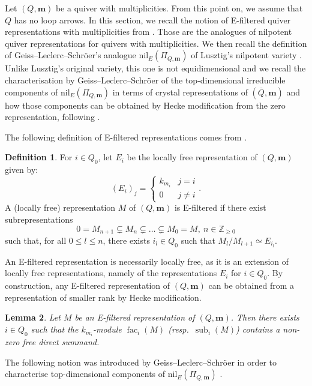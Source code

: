 \documentclass[a4paper,12pt]{article}
\theoremstyle{definition}
\newtheorem{definition}{Definition}[section]
\theoremstyle{plain}
\newtheorem{lemma}[definition]{Lemma}
\theoremstyle{remark}
\DeclareMathOperator{\fac}{fac}
\DeclareMathOperator{\sub}{sub}
\newcommand\bbZ{\mathbb{Z}}
\newcommand\bfm{\mathbf{m}}
\begin{document}
Let $(Q,\bfm)$ be a quiver with multiplicities. From this point on, we assume that $Q$ has no loop arrows. In this section, we recall the notion of E-filtered quiver representations with multiplicities from \cite{GLS18a}. Those are the analogues of nilpotent quiver representations for quivers with multiplicities. We then recall the definition of Geiss--Leclerc--Schr\"{o}er's analogue $\mathrm{nil}_E(\Pi_{Q,\bfm})$ of Lusztig's nilpotent variety \cite[\S 12]{Lus91}. Unlike Lusztig's original variety, this one is not equidimensional and we recall the characterisation by Geiss--Leclerc--Schr\"{o}er of the top-dimensional irreducible components of $\mathrm{nil}_E(\Pi_{Q,\bfm})$ in terms of crystal representations of $(\overline{Q},\bfm)$ and how those components can be obtained by Hecke modification from the zero representation, following \cite[\S 4]{GLS18a}.

The following definition of E-filtered representations comes from \cite[\S 2.1]{GLS18a}.

\begin{definition}\label{def/E-filteredRep}
For $i\in Q_0$, let $E_i$ be the locally free representation of $(Q,\bfm)$ given by:
\[
(E_i)_j=
\left\{
\begin{array}{ll}
k_{m_i} & j=i \\
0 & j\ne i
\end{array}
\right.
.
\]
A (locally free) representation $M$ of $(Q,\bfm)$ is E-filtered if there exist subrepresentations
\[
0=M_{n+1}\subsetneq M_n\subsetneq\ldots\subsetneq M_0=M,
\ n\in\bbZ_{\geq0}
\]
such that, for all $0\leq l\leq n$, there exists $i_l\in Q_0$ such that $M_l/M_{l+1}\simeq E_{i_l}$.
\end{definition}

An E-filtered representation is necessarily locally free, as it is an extension of locally free representations, namely of the representations $E_i$ for $i\in Q_0$. By construction, any E-filtered representation of $(Q,\bfm)$ can be obtained from a representation of smaller rank by Hecke modification.

\begin{lemma}\label{Lem/facSubE-filteredRep}
\emph{\cite[Lem.\ 3.1]{GLS18a}} Let $M$ be an E-filtered representation of $(Q,\bfm)$. Then there exists $i\in Q_0$ such that the $k_{m_i}$-module $\fac_i(M)$ (resp.\ $\sub_i(M)$) contains a non-zero free direct summand.
\end{lemma}

The following notion was introduced by Geiss--Leclerc--Schr\"{o}er in order to characterise top-dimensional components of $\mathrm{nil}_E(\Pi_{Q,\bfm})$ \cite[\S 4]{GLS18a}.
\end{document}

